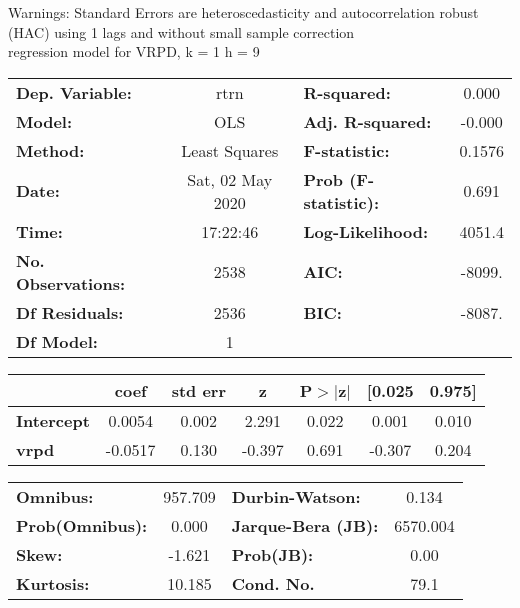 Warnings: \newline
 [1] Standard Errors are heteroscedasticity and autocorrelation robust (HAC) using 1 lags and without small sample correction\\ 

regression model for VRPD, k = 1 h = 9\begin{center}
\begin{tabular}{lclc}
\toprule
\textbf{Dep. Variable:}    &       rtrn       & \textbf{  R-squared:         } &     0.000   \\
\textbf{Model:}            &       OLS        & \textbf{  Adj. R-squared:    } &    -0.000   \\
\textbf{Method:}           &  Least Squares   & \textbf{  F-statistic:       } &    0.1576   \\
\textbf{Date:}             & Sat, 02 May 2020 & \textbf{  Prob (F-statistic):} &    0.691    \\
\textbf{Time:}             &     17:22:46     & \textbf{  Log-Likelihood:    } &    4051.4   \\
\textbf{No. Observations:} &        2538      & \textbf{  AIC:               } &    -8099.   \\
\textbf{Df Residuals:}     &        2536      & \textbf{  BIC:               } &    -8087.   \\
\textbf{Df Model:}         &           1      & \textbf{                     } &             \\
\bottomrule
\end{tabular}
\begin{tabular}{lcccccc}
                   & \textbf{coef} & \textbf{std err} & \textbf{z} & \textbf{P$> |$z$|$} & \textbf{[0.025} & \textbf{0.975]}  \\
\midrule
\textbf{Intercept} &       0.0054  &        0.002     &     2.291  &         0.022        &        0.001    &        0.010     \\
\textbf{vrpd}      &      -0.0517  &        0.130     &    -0.397  &         0.691        &       -0.307    &        0.204     \\
\bottomrule
\end{tabular}
\begin{tabular}{lclc}
\textbf{Omnibus:}       & 957.709 & \textbf{  Durbin-Watson:     } &    0.134  \\
\textbf{Prob(Omnibus):} &   0.000 & \textbf{  Jarque-Bera (JB):  } & 6570.004  \\
\textbf{Skew:}          &  -1.621 & \textbf{  Prob(JB):          } &     0.00  \\
\textbf{Kurtosis:}      &  10.185 & \textbf{  Cond. No.          } &     79.1  \\
\bottomrule
\end{tabular}
\end{center}

